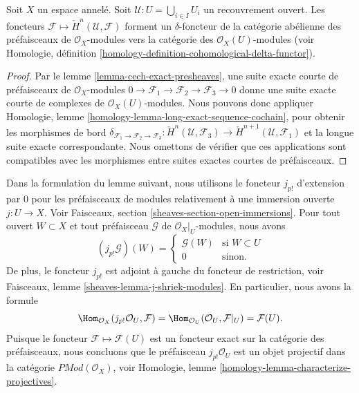 \begin{lemma}

\label{lemma-cech-cohomology-delta-functor-presheaves}

Soit $X$ un espace annelé. Soit $\mathcal{U} : U = \bigcup_{i \in I} U_i$ un recouvrement ouvert. Les foncteurs $\mathcal{F} \mapsto \check{H}^n(\mathcal{U}, \mathcal{F})$
forment un $\delta$-foncteur de la catégorie abélienne des préfaisceaux de $\mathcal{O}_X$-modules vers la catégorie des $\mathcal{O}_X(U)$-modules (voir Homologie, définition \ref{homology-definition-cohomological-delta-functor}).

\end{lemma}

\begin{proof}
Par le lemme \ref{lemma-cech-exact-presheaves}, une suite exacte courte de préfaisceaux de $\mathcal{O}_X$-modules $0 \to \mathcal{F}_1 \to \mathcal{F}_2 \to \mathcal{F}_3 \to 0$ donne une suite exacte courte de complexes de $\mathcal{O}_X(U)$-modules. Nous pouvons donc appliquer Homologie, lemme \ref{homology-lemma-long-exact-sequence-cochain}, pour obtenir les morphismes de bord $\delta_{\mathcal{F}_1 \to \mathcal{F}_2 \to \mathcal{F}_3} :
\check{H}^n(\mathcal{U}, \mathcal{F}_3) \to
\check{H}^{n + 1}(\mathcal{U}, \mathcal{F}_1)$ et la longue suite exacte correspondante. Nous omettons de vérifier que ces applications sont compatibles avec les morphismes entre suites exactes courtes de préfaisceaux.
\end{proof}

\noindent

Dans la formulation du lemme suivant, nous utilisons le foncteur $j_{p!}$ d'extension par $0$ pour les préfaisceaux de modules relativement à une immersion ouverte $j : U \to X$. Voir Faisceaux, section \ref{sheaves-section-open-immersions}. Pour tout ouvert
$W \subset X$ et tout préfaisceau $\mathcal{G}$ de $\mathcal{O}_X|_U$-modules, nous avons
$$
(j_{p!}\mathcal{G})(W) =
\left\{
\begin{matrix}
\mathcal{G}(W) & \text{si } W \subset U \\
0 & \text{sinon.}
\end{matrix}
\right.
$$
De plus, le foncteur $j_{p!}$ est adjoint à gauche du foncteur de restriction, voir Faisceaux, lemme \ref{sheaves-lemma-j-shriek-modules}. En particulier, nous avons la formule
$$
\Hom_{\mathcal{O}_X}(j_{p!}\mathcal{O}_U, \mathcal{F})
=
\Hom_{\mathcal{O}_U}(\mathcal{O}_U, \mathcal{F}|_U)
=
\mathcal{F}(U).
$$
Puisque le foncteur $\mathcal{F} \mapsto \mathcal{F}(U)$ est un foncteur exact sur la catégorie des préfaisceaux, nous concluons que le préfaisceau
$j_{p!}\mathcal{O}_U$ est un objet projectif dans la catégorie
$\textit{PMod}(\mathcal{O}_X)$, voir Homologie, lemme \ref{homology-lemma-characterize-projectives}.

